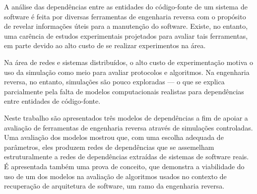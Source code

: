 
A análise das dependências entre as entidades do código-fonte de um sistema de software é feita por diversas ferramentas de engenharia reversa com o propósito de revelar informações úteis para a manutenção do software. Existe, no entanto, uma carência de estudos experimentais projetados para avaliar tais ferramentas, em parte devido ao alto custo de se realizar experimentos na área. 

Na área de redes e sistemas distribuídos, o alto custo de experimentação motiva o uso da simulação como meio para avaliar protocolos e algoritmos. Na engenharia reversa, no entanto, simulações são pouco exploradas --- o que se explica parcialmente pela falta de modelos computacionais realistas para dependências entre entidades de código-fonte.

Neste trabalho são apresentados três modelos de dependências a fim de apoiar a avaliação de ferramentas de engenharia reversa através de simulações controladas. Uma avaliação dos modelos mostrou que, com uma escolha adequada de parâmetros, eles produzem redes de dependências que se assemelham estruturalmente a redes de dependências extraídas de sistemas de software reais. É apresentada também uma prova de conceito, que demonstra a viabilidade do uso de um dos modelos na avaliação de algoritmos usados no contexto de recuperação de arquitetura de software, um ramo da engenharia reversa.


